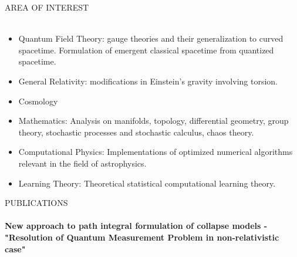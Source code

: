 \documentclass[a4paper]{article}
\newcommand{\lineunder} {
    \vspace*{-8pt} \\
    \hspace*{-18pt} \hrulefill \\
}
\newcommand{\header} [1] {
    {\hspace*{-18pt}\vspace*{6pt} \textsc{#1}}
    \vspace*{-6pt} \lineunder
}
\begin{document}
\header{AREA OF INTEREST}
\begin{itemize}
    \item Quantum Field Theory: gauge theories and their generalization to curved spacetime. Formulation of emergent classical spacetime from quantized spacetime.
    \item General Relativity: modifications in Einstein's gravity involving torsion.
    \item Cosmology
    \item Mathematics: Analysis on manifolds, topology, differential geometry, group theory, stochastic processes and stochastic calculus, chaos theory.
    \item Computational Physics: Implementations of optimized numerical algorithms relevant in the field of astrophysics. 
    \item Learning Theory: Theoretical statistical computational learning theory.
    
\end{itemize}

\header{PUBLICATIONS}
\textbf{New approach to path integral formulation of collapse models - "Resolution of Quantum Measurement Problem in non-relativistic case"} \\
\end{document}
